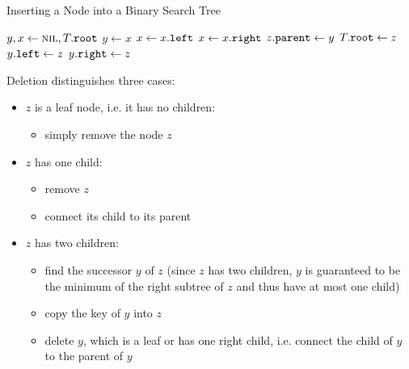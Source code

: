 \begin{algorithm}[htb]
  \caption{Inserting a Node into a Binary Search Tree}
  \label{alg:bst_insert}
  \begin{algorithmic}[1]
      \State $y, x \gets \textsc{nil}, T\mathtt{.}\mathtt{root}$
        \State $y\gets x$
          \State $x\gets x\mathtt{.}\mathtt{left}$
        \Else
          \State $x\gets x\mathtt{.}\mathtt{right}$
        \EndIf
      \EndWhile
      \State $z\mathtt{.}\mathtt{parent}\gets y$
        \State $T\mathtt{.}\mathtt{root}\gets z$
        \State $y\mathtt{.}\mathtt{left}\gets z$
      \Else
        \State $y\mathtt{.}\mathtt{right}\gets z$
      \EndIf
    \EndFunction
  \end{algorithmic}
\end{algorithm}


Deletion distinguishes three cases:
\begin{itemize}%
  \item \(z\) is a leaf node, i.e. it has no children:
    \begin{itemize}%
      \item simply remove the node \(z\)
    \end{itemize}
  \item \(z\) has one child:
    \begin{itemize}%
      \item remove \(z\)
      \item connect its child to its parent
    \end{itemize}
  \item \(z\) has two children:
    \begin{itemize}%
      \item find the successor \(y\) of \(z\) (since \(z\) has two children, \(y\) is guaranteed to be the minimum of the right subtree of \(z\) and thus have at most one child)
      \item copy the key of \(y\) into \(z\)\nopagebreak
      \item delete \(y\), which is a leaf or has one right child, i.e. connect the child of \(y\) to the parent of \(y\)
    \end{itemize}
\end{itemize}

